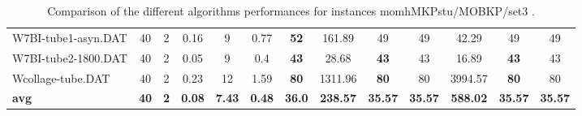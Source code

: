 \begin{table}[h]
{\begin{tabular}{lcccccccccccc}
W7BI-tube1-asyn.DAT & 40 & 2 &  \textcolor{blue2}{0.16} & 9 & 0.77 &  \textbf{52} & 161.89 & 49 & 49 & 42.29 & 49 & 49 \\
W7BI-tube2-1800.DAT & 40 & 2 &  \textcolor{blue2}{0.05} & 9 & 0.4 &  \textbf{43} & 28.68 &  \textbf{43} & 43 & 16.89 &  \textbf{43} & 43 \\
Wcollage-tube.DAT & 40 & 2 &  \textcolor{blue2}{0.23} & 12 & 1.59 &  \textbf{80} & 1311.96 &  \textbf{80} & 80 & 3994.57 &  \textbf{80} & 80 \\
\cline{1-13} \textbf{avg} & \textbf{40} & \textbf{2} & \textbf{0.08} & \textbf{7.43} & \textbf{0.48} & \textbf{36.0} & \textbf{238.57} & \textbf{35.57} & \textbf{35.57} & \textbf{588.02} & \textbf{35.57} & \textbf{35.57} \\ \cline{1-13}
\bottomrule
\end{tabular}
}%
\caption{Comparison of the different algorithms performances for instances momhMKPstu/MOBKP/set3 .}
\label{tab:table_compare_momhMKPstu/MOBKP/set3 }
\end{table}
